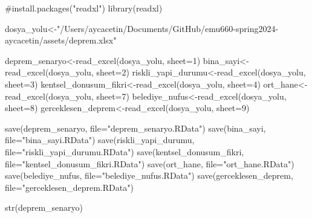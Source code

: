 \documentclass[
  11pt,
  a4paper,
  DIV=11,
  numbers=noendperiod]{scrartcl}
\newenvironment{Shaded}{\begin{snugshade}}{\end{snugshade}}
\newcommand{\AttributeTok}[1]{\textcolor[rgb]{0.40,0.45,0.13}{#1}}
\newcommand{\CommentTok}[1]{\textcolor[rgb]{0.37,0.37,0.37}{#1}}
\newcommand{\DecValTok}[1]{\textcolor[rgb]{0.68,0.00,0.00}{#1}}
\newcommand{\FunctionTok}[1]{\textcolor[rgb]{0.28,0.35,0.67}{#1}}
\newcommand{\NormalTok}[1]{\textcolor[rgb]{0.00,0.23,0.31}{#1}}
\newcommand{\OtherTok}[1]{\textcolor[rgb]{0.00,0.23,0.31}{#1}}
\newcommand{\StringTok}[1]{\textcolor[rgb]{0.13,0.47,0.30}{#1}}
\begin{document}
\begin{Shaded}
\begin{Highlighting}[]
\CommentTok{\#install.packages("readxl")}
\FunctionTok{library}\NormalTok{(readxl)}

\NormalTok{dosya\_yolu}\OtherTok{\textless{}{-}}\StringTok{"/Users/aycacetin/Documents/GitHub/emu660{-}spring2024{-}aycacetin/assets/deprem.xlsx"}

\NormalTok{deprem\_senaryo}\OtherTok{\textless{}{-}}\FunctionTok{read\_excel}\NormalTok{(dosya\_yolu, }\AttributeTok{sheet=}\DecValTok{1}\NormalTok{)}
\NormalTok{bina\_sayi}\OtherTok{\textless{}{-}}\FunctionTok{read\_excel}\NormalTok{(dosya\_yolu, }\AttributeTok{sheet=}\DecValTok{2}\NormalTok{)}
\NormalTok{riskli\_yapi\_durumu}\OtherTok{\textless{}{-}}\FunctionTok{read\_excel}\NormalTok{(dosya\_yolu, }\AttributeTok{sheet=}\DecValTok{3}\NormalTok{)}
\NormalTok{kentsel\_donusum\_fikri}\OtherTok{\textless{}{-}}\FunctionTok{read\_excel}\NormalTok{(dosya\_yolu, }\AttributeTok{sheet=}\DecValTok{4}\NormalTok{)}
\NormalTok{ort\_hane}\OtherTok{\textless{}{-}}\FunctionTok{read\_excel}\NormalTok{(dosya\_yolu, }\AttributeTok{sheet=}\DecValTok{7}\NormalTok{)}
\NormalTok{belediye\_nufus}\OtherTok{\textless{}{-}}\FunctionTok{read\_excel}\NormalTok{(dosya\_yolu, }\AttributeTok{sheet=}\DecValTok{8}\NormalTok{)}
\NormalTok{gerceklesen\_deprem}\OtherTok{\textless{}{-}}\FunctionTok{read\_excel}\NormalTok{(dosya\_yolu, }\AttributeTok{sheet=}\DecValTok{9}\NormalTok{)}

\FunctionTok{save}\NormalTok{(deprem\_senaryo, }\AttributeTok{file=}\StringTok{"deprem\_senaryo.RData"}\NormalTok{)}
\FunctionTok{save}\NormalTok{(bina\_sayi, }\AttributeTok{file=}\StringTok{"bina\_sayi.RData"}\NormalTok{)}
\FunctionTok{save}\NormalTok{(riskli\_yapi\_durumu, }\AttributeTok{file=}\StringTok{"riskli\_yapi\_durumu.RData"}\NormalTok{)}
\FunctionTok{save}\NormalTok{(kentsel\_donusum\_fikri, }\AttributeTok{file=}\StringTok{"kentsel\_donusum\_fikri.RData"}\NormalTok{)}
\FunctionTok{save}\NormalTok{(ort\_hane, }\AttributeTok{file=}\StringTok{"ort\_hane.RData"}\NormalTok{)}
\FunctionTok{save}\NormalTok{(belediye\_nufus, }\AttributeTok{file=}\StringTok{"belediye\_nufus.RData"}\NormalTok{)}
\FunctionTok{save}\NormalTok{(gerceklesen\_deprem, }\AttributeTok{file=}\StringTok{"gerceklesen\_deprem.RData"}\NormalTok{)}

\FunctionTok{str}\NormalTok{(deprem\_senaryo)}
\end{Highlighting}
\end{Shaded}
\end{document}
